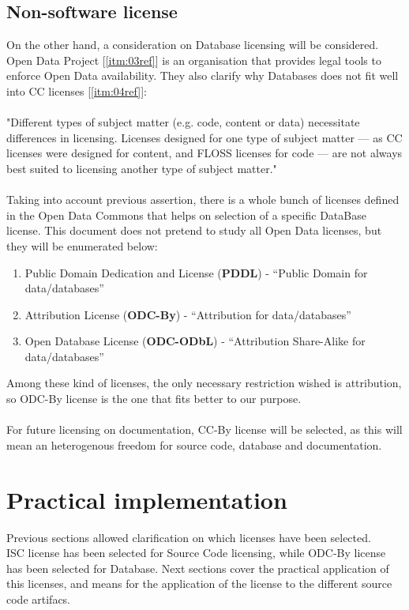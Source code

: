 \documentclass[11pt]{article}
\begin{document}
\subsection{Non-software license}
On the other hand, a consideration on Database licensing will be considered. Open Data Project [\ref{itm:03ref}] is an organisation that provides legal tools to enforce Open Data availability. They also clarify why Databases does not fit well into CC licenses [\ref{itm:04ref}]:\\
\\
"Different types of subject matter (e.g. code, content or data) necessitate differences in licensing. Licenses designed for one type of subject matter — as CC licenses were designed for content, and FLOSS licenses for code — are not always best suited to licensing another type of subject matter."\\
\\
Taking into account previous assertion, there is a whole bunch of licenses defined in the Open Data Commons that helps on selection of a specific DataBase license. This document does not pretend to study all Open Data licenses, but they will be enumerated below:
\begin{enumerate}
\item \label{itm:01odc}Public Domain Dedication and License (\textbf{PDDL}) - “Public Domain for data/databases”
\item \label{itm:02odc}Attribution License (\textbf{ODC-By}) - “Attribution for data/databases”
\item \label{itm:03odc}Open Database License (\textbf{ODC-ODbL}) - “Attribution Share-Alike for data/databases”
\end{enumerate}
Among these kind of licenses, the only necessary restriction wished is attribution, so ODC-By license is the one that fits better to our purpose.\\
\\
For future licensing on documentation, CC-By license will be selected, as this will mean an heterogenous freedom for source code, database and documentation.
\newpage
\section{Practical implementation}

Previous sections allowed clarification on which licenses have been selected.\\
ISC license has been selected for Source Code licensing, while ODC-By license has been selected for Database. Next sections cover the practical application of this licenses, and means for the application of the license to the different source code artifacs.
\end{document}
